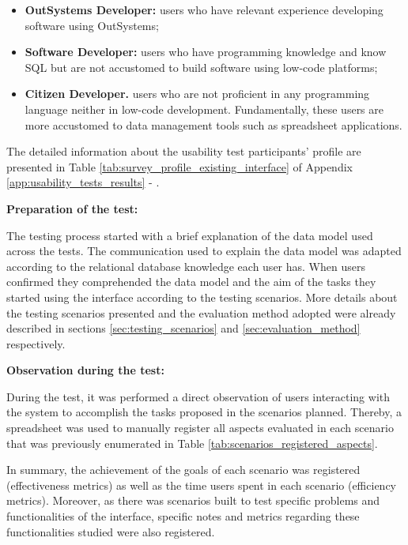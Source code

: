 \begin{itemize}
    \item \textbf{OutSystems Developer: }users who have relevant experience developing software using OutSystems;
    \item \textbf{Software Developer: }users who have programming knowledge and know \gls{SQL} but are not accustomed to build software using low-code platforms;
    \item \textbf{Citizen Developer. }users who are not proficient in any programming language neither in low-code development. Fundamentally, these users are more accustomed to data management tools such as spreadsheet applications.
\end{itemize}

The detailed information about the usability test participants' profile are presented in Table \ref{tab:survey_profile_existing_interface} of Appendix \ref{app:usability_tests_results} - .

\medskip
\textbf{Preparation of the test:}
\medskip

The testing process started with a brief explanation of the data model used across the tests. The communication used to explain the data model was adapted according to the relational database knowledge each user has. When users confirmed they comprehended the data model and the aim of the tasks they started using the interface according to the testing scenarios. More details about the testing scenarios presented and the evaluation method adopted were already described in sections \ref{sec:testing_scenarios} and \ref{sec:evaluation_method} respectively.

\medskip
\textbf{Observation during the test:}
\medskip

During the test, it was performed a direct observation of users interacting with the system to accomplish the tasks proposed in the scenarios planned. Thereby, a spreadsheet was used to manually register all aspects evaluated in each scenario that was previously enumerated in Table \ref{tab:scenarios_registered_aspects}.

In summary, the achievement of the goals of each scenario was registered (effectiveness metrics) as well as the time users spent in each scenario (efficiency metrics). Moreover, as there was scenarios built to test specific problems and functionalities of the interface, specific notes and metrics regarding these functionalities studied were also registered.

